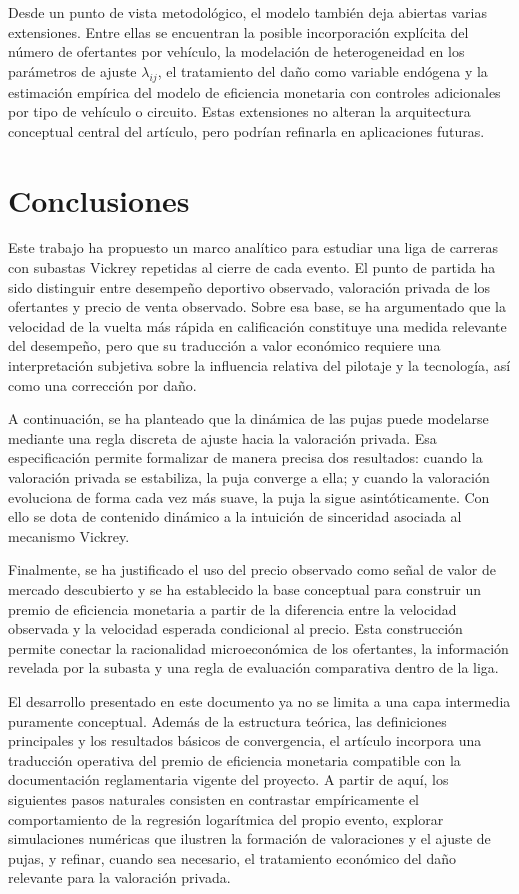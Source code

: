 \documentclass[11pt,a4paper]{article}
\theoremstyle{definition}
\begin{document}
Desde un punto de vista metodológico, el modelo también deja abiertas varias extensiones. Entre ellas se encuentran la posible incorporación explícita del número de ofertantes por vehículo, la modelación de heterogeneidad en los parámetros de ajuste $\lambda_{ij}$, el tratamiento del daño como variable endógena y la estimación empírica del modelo de eficiencia monetaria con controles adicionales por tipo de vehículo o circuito. Estas extensiones no alteran la arquitectura conceptual central del artículo, pero podrían refinarla en aplicaciones futuras.

\section{Conclusiones}

Este trabajo ha propuesto un marco analítico para estudiar una liga de carreras con subastas Vickrey repetidas al cierre de cada evento. El punto de partida ha sido distinguir entre desempeño deportivo observado, valoración privada de los ofertantes y precio de venta observado. Sobre esa base, se ha argumentado que la velocidad de la vuelta más rápida en calificación constituye una medida relevante del desempeño, pero que su traducción a valor económico requiere una interpretación subjetiva sobre la influencia relativa del pilotaje y la tecnología, así como una corrección por daño.

A continuación, se ha planteado que la dinámica de las pujas puede modelarse mediante una regla discreta de ajuste hacia la valoración privada. Esa especificación permite formalizar de manera precisa dos resultados: cuando la valoración privada se estabiliza, la puja converge a ella; y cuando la valoración evoluciona de forma cada vez más suave, la puja la sigue asintóticamente. Con ello se dota de contenido dinámico a la intuición de sinceridad asociada al mecanismo Vickrey.

Finalmente, se ha justificado el uso del precio observado como señal de valor de mercado descubierto y se ha establecido la base conceptual para construir un premio de eficiencia monetaria a partir de la diferencia entre la velocidad observada y la velocidad esperada condicional al precio. Esta construcción permite conectar la racionalidad microeconómica de los ofertantes, la información revelada por la subasta y una regla de evaluación comparativa dentro de la liga.

El desarrollo presentado en este documento ya no se limita a una capa intermedia puramente conceptual. Además de la estructura teórica, las definiciones principales y los resultados básicos de convergencia, el artículo incorpora una traducción operativa del premio de eficiencia monetaria compatible con la documentación reglamentaria vigente del proyecto. A partir de aquí, los siguientes pasos naturales consisten en contrastar empíricamente el comportamiento de la regresión logarítmica del propio evento, explorar simulaciones numéricas que ilustren la formación de valoraciones y el ajuste de pujas, y refinar, cuando sea necesario, el tratamiento económico del daño relevante para la valoración privada.
\end{document}
